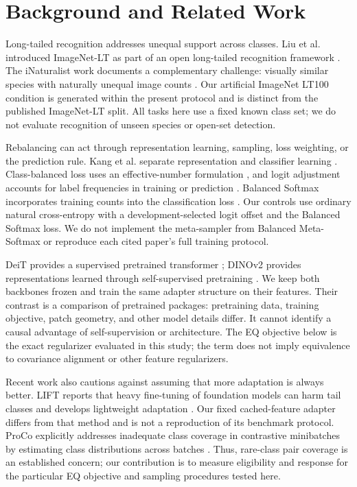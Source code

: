 \documentclass[conference]{IEEEtran}
\begin{document}
\section{Background and Related Work}
Long-tailed recognition addresses unequal support across classes. Liu et al. introduced ImageNet-LT as part of an open long-tailed recognition framework \cite{liu2019}. The iNaturalist work documents a complementary challenge: visually similar species with naturally unequal image counts \cite{vanhorn2018}. Our artificial ImageNet LT100 condition is generated within the present protocol and is distinct from the published ImageNet-LT split. All tasks here use a fixed known class set; we do not evaluate recognition of unseen species or open-set detection.

Rebalancing can act through representation learning, sampling, loss weighting, or the prediction rule. Kang et al. separate representation and classifier learning \cite{kang2020}. Class-balanced loss uses an effective-number formulation \cite{cui2019}, and logit adjustment accounts for label frequencies in training or prediction \cite{menon2021}. Balanced Softmax incorporates training counts into the classification loss \cite{ren2020}. Our controls use ordinary natural cross-entropy with a development-selected logit offset and the Balanced Softmax loss. We do not implement the meta-sampler from Balanced Meta-Softmax or reproduce each cited paper's full training protocol.

DeiT provides a supervised pretrained transformer \cite{touvron2021}; DINOv2 provides representations learned through self-supervised pretraining \cite{oquab2023}. We keep both backbones frozen and train the same adapter structure on their features. Their contrast is a comparison of pretrained packages: pretraining data, training objective, patch geometry, and other model details differ. It cannot identify a causal advantage of self-supervision or architecture. The EQ objective below is the exact regularizer evaluated in this study; the term does not imply equivalence to covariance alignment or other feature regularizers.


Recent work also cautions against assuming that more adaptation is always better. LIFT reports that heavy fine-tuning of foundation models can harm tail classes and develops lightweight adaptation \cite{shi2024}. Our fixed cached-feature adapter differs from that method and is not a reproduction of its benchmark protocol. ProCo explicitly addresses inadequate class coverage in contrastive minibatches by estimating class distributions across batches \cite{du2024}. Thus, rare-class pair coverage is an established concern; our contribution is to measure eligibility and response for the particular EQ objective and sampling procedures tested here.
\end{document}
